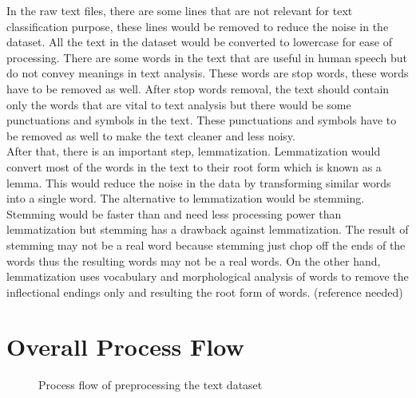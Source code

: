 In the raw text files, there are some lines that are not relevant for text classification purpose, these lines would be removed to reduce the noise in the dataset. All the text in the dataset would be converted to lowercase for ease of processing. There are some words in the text that are useful in human speech but do not convey meanings in text analysis. These words are stop words, these words have to be removed as well. After stop words removal, the text should contain only the words that are vital to text analysis but there would be some punctuations and symbols in the text. These punctuations and symbols have to be removed as well to make the text cleaner and less noisy.\\

After that, there is an important step, lemmatization. Lemmatization would convert most of the words in the text to their root form which is known as a lemma. This would reduce the noise in the data by transforming similar words into a single word. The alternative to lemmatization would be stemming. Stemming would be faster than and need less processing power than lemmatization but stemming has a drawback against lemmatization. The result of stemming may not be a real word because stemming just chop off the ends of the words thus the resulting words may not be a real words. On the other hand, lemmatization uses vocabulary and morphological analysis of words to remove the inflectional endings only and resulting the root form of words.
(reference needed)

\clearpage
\section{Overall Process Flow}
\begin{figure} [ht]
\centering
{}
\caption{Process flow of preprocessing the text dataset}
\label{fig: preprocessText}
\end{figure}

